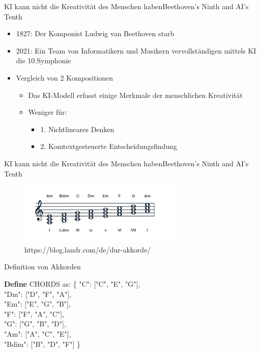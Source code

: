 \documentclass[169,9pt]{beamer}
\begin{document}
\begin{frame}{KI kann nicht die Kreativität des Menschen haben}{Beethoven's Ninth
and AI's Tenth}
    \begin{itemize}
        \item 1827: Der Komponist Ludwig van Beethoven starb
        \item 2021: Ein Team von Informatikern und Musikern vervollständigen mittels KI die 10.Symphonie
        \item Vergleich von 2 Kompositionen
            \begin{itemize}
                \item Das KI-Modell erfasst einige Merkmale der menschlichen Kreativität
                \item Weniger für: 
                    \begin{itemize}
                        \item 1. Nichtlineares Denken
                        \item 2. Komtextgesteuerte Entscheidungsfindung
                    \end{itemize}
            \end{itemize}
    \end{itemize}
\end{frame}

\begin{frame}{KI kann nicht die Kreativität des Menschen haben}{Beethoven's Ninth and AI's Tenth}
\begin{figure}[h]
    \centering
    \includegraphics[width=0.7\textwidth]{Bildschirmfoto vom 2024-07-21 11-21-32.png}
    \caption{\smaller \smaller \smaller \smaller https://blog.landr.com/de/dur-akkorde/}
    \label{fig:my_label}
\end{figure}
\begin{algorithm}[H]
    \caption{Definition von Akkorden}
    \begin{algorithmic}[1]
    \State \textbf{Define} CHORDS as:
    \State \{ "C": ["C", "E", "G"], \\"Dm": ["D", "F", "A"], \\"Em": ["E", "G", "B"],\\ "F": ["F", "A", "C"], \\"G": ["G", "B", "D"], \\"Am": ["A", "C", "E"], \\"Bdim": ["B", "D", "F"] \}
    \State    
    \end{algorithmic}
    \end{algorithm}
\end{frame}
\end{document}
